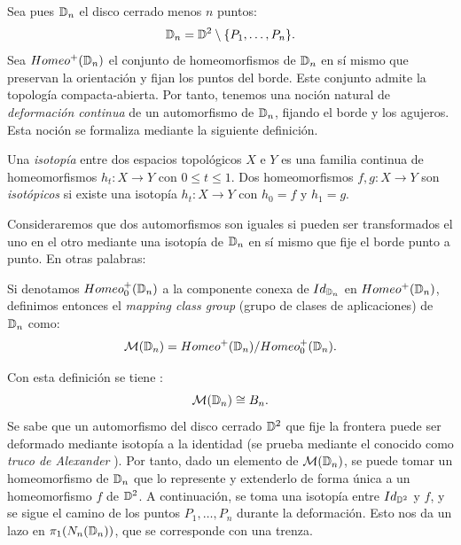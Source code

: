 \documentclass[TFG.tex]{subfiles}
\begin{document}
Sea pues $\mathbb{D}_n$ el disco cerrado menos $n$ puntos:
$$\mathbb{D}_n=\mathbb{D}^2\setminus\{P_1,\dots, P_n\}.$$
Sea $Homeo^+(\mathbb{D}_n)$ el conjunto de homeomorfismos de $\mathbb{D}_n$ en sí mismo que preservan la orientación y fijan los puntos del borde. Este conjunto admite la topología compacta-abierta. %
Por tanto, tenemos una noción natural de \emph{deformación continua} de un automorfismo de $\mathbb{D}_n$, fijando el borde y los agujeros. Esta noción se formaliza mediante la siguiente definición.

\begin{defi}
Una \emph{isotopía} entre dos espacios topológicos $X$ e $Y$ es una familia continua de homeomorfismos $h_t:X\to Y$ con $0\leq t\leq 1$. Dos homeomorfismos $f,g:X\to Y$ son \emph{isotópicos} si existe una isotopía $h_t:X\to Y$ con $h_0=f$ y $h_1=g$. 
\end{defi}

Consideraremos que dos automorfismos son iguales si pueden ser transformados el uno en el otro mediante una isotopía de $\mathbb{D}_n$ en sí mismo que fije el borde punto a punto. En otras palabras:


\begin{defi} Si denotamos $Homeo^+_0(\mathbb{D}_n)$ a la componente conexa de $Id_{\mathbb{D}_n}$ en $Homeo^+(\mathbb{D}_n)$, definimos entonces el \emph{mapping class group} (grupo de clases de aplicaciones) de $\mathbb{D}_n$ como:
$$\mathcal{M}(\mathbb{D}_n)=Homeo^+(\mathbb{D}_n)/Homeo^+_0(\mathbb{D}_n).$$
\end{defi}

Con esta definición se tiene \cite{Magnus}:
$$\mathcal{M}(\mathbb{D}_n)\cong B_n.$$
Se sabe que un automorfismo del disco cerrado $\mathbb{D}^2$ que fije la frontera puede ser deformado mediante isotopía a la identidad (se prueba mediante el conocido como \emph{truco de Alexander} \cite{Alexander}). Por tanto, dado un elemento de $\mathcal{M}(\mathbb{D}_n)$, se puede tomar un homeomorfismo de $\mathbb{D}_n$ que lo represente y extenderlo de forma única a un homeomorfismo $f$ de $\mathbb{D}^2$. A continuación, se toma una isotopía entre $Id_{\mathbb{D}^2}$ y $f$, y se sigue el camino de los puntos $P_1,\dots, P_n$ durante la deformación. Esto nos da un lazo en $\pi_1(N_n(\mathbb{D}_n))$, que se corresponde con una trenza. 


\end{document}
